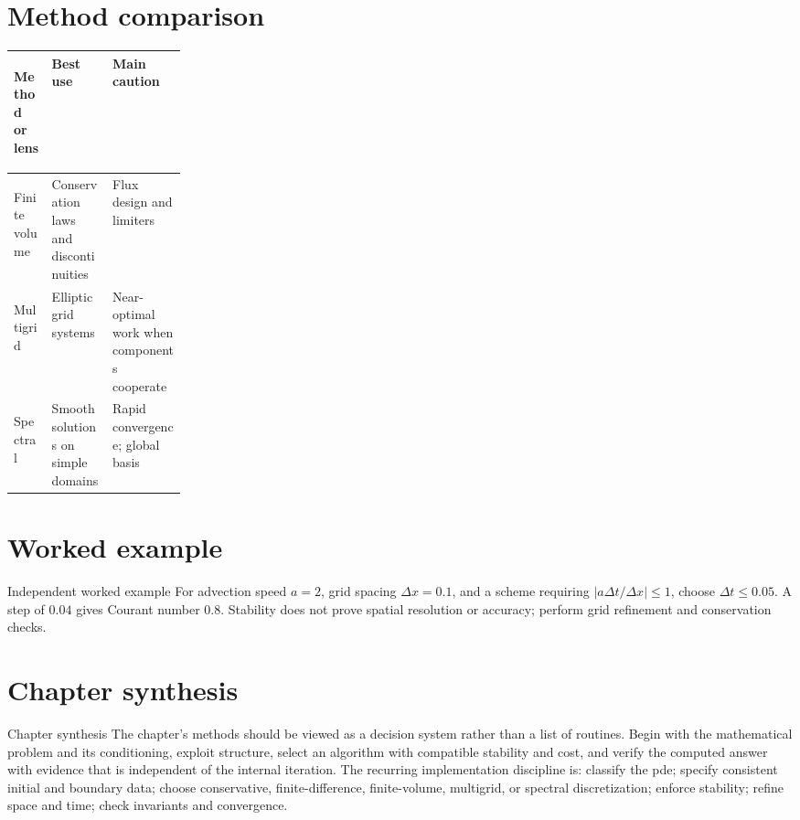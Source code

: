 \documentclass[10pt,letterpaper]{article}
\begin{document}
\section*{Method comparison}
\begin{center}
\small
\begin{tabularx}{\linewidth}{>{\bfseries\raggedright\arraybackslash}p{0.22\linewidth}XX}
\toprule
Method or lens & Best use & Main caution \\
\midrule
Finite volume & Conservation laws and discontinuities & Flux design and limiters \\
Multigrid & Elliptic grid systems & Near-optimal work when components cooperate \\
Spectral & Smooth solutions on simple domains & Rapid convergence; global basis \\
\bottomrule
\end{tabularx}
\end{center}

\section*{Worked example}
\begin{exambox}{Independent worked example}
For advection speed $a=2$, grid spacing $\Delta x=0.1$, and a scheme requiring $|a\Delta t/\Delta x|\le1$, choose $\Delta t\le0.05$.  A step of $0.04$ gives Courant number $0.8$.  Stability does not prove spatial resolution or accuracy; perform grid refinement and conservation checks.
\end{exambox}

\section*{Chapter synthesis}
\begin{summarybox}{Chapter synthesis}
The chapter's methods should be viewed as a decision system rather than a list of routines.  Begin with the mathematical problem and its conditioning, exploit structure, select an algorithm with compatible stability and cost, and verify the computed answer with evidence that is independent of the internal iteration.  The recurring implementation discipline is: classify the pde; specify consistent initial and boundary data; choose conservative, finite-difference, finite-volume, multigrid, or spectral discretization; enforce stability; refine space and time; check invariants and convergence.
\end{summarybox}
\end{document}
